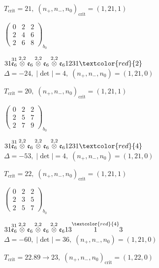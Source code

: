 \documentclass[10pt]{article}
\begin{document}
\hspace{1em}$T_{\text{crit}}=21,\; (n_+,n_-,n_0)_{\text{crit}}=(1,21,1)$

\hspace{2em}$\left(\begin{smallmatrix}0 & 2 & 2 \\ 2 & 4 & 6 \\ 2 & 6 & 8\end{smallmatrix}\right)_{\!b_0}$

$31\overset{31}{\mathfrak{e}_6}\overset{2,2}{\otimes}\mathfrak{e}_6\overset{2,2}{\otimes}\mathfrak{e}_6\overset{2,2}{\otimes}\mathfrak{e}_61231\textcolor{red}{2}$ \quad $\Delta=-24,\; |\det|=4,\; (n_+,n_-,n_0)=(1,21,0)$

\hspace{1em}$T_{\text{crit}}=20,\; (n_+,n_-,n_0)_{\text{crit}}=(1,21,1)$

\hspace{2em}$\left(\begin{smallmatrix}0 & 2 & 2 \\ 2 & 5 & 7 \\ 2 & 7 & 9\end{smallmatrix}\right)_{\!b_0}$

$31\overset{31}{\mathfrak{e}_6}\overset{2,2}{\otimes}\mathfrak{e}_6\overset{2,2}{\otimes}\mathfrak{e}_6\overset{2,2}{\otimes}\mathfrak{e}_61231\textcolor{red}{4}$ \quad $\Delta=-53,\; |\det|=4,\; (n_+,n_-,n_0)=(1,21,0)$

\hspace{1em}$T_{\text{crit}}=22,\; (n_+,n_-,n_0)_{\text{crit}}=(1,21,1)$

\hspace{2em}$\left(\begin{smallmatrix}0 & 2 & 2 \\ 2 & 3 & 5 \\ 2 & 5 & 7\end{smallmatrix}\right)_{\!b_0}$

\smallskip

$31\overset{31}{\mathfrak{e}_6}\overset{2,2}{\otimes}\mathfrak{e}_6\overset{2,2}{\otimes}\mathfrak{e}_6\overset{2,2}{\otimes}\mathfrak{e}_613\overset{\textcolor{red}{4}}{1}3$ \quad $\Delta=-60,\; |\det|=36,\; (n_+,n_-,n_0)=(1,21,0)$

\hspace{1em}$T_{\text{crit}}=22.89 \to 23,\; (n_+,n_-,n_0)_{\text{crit}}=(1,22,0)$
\end{document}
